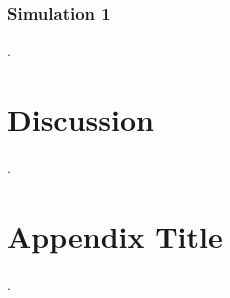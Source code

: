 \documentclass[draft, grl]{agutex}
\begin{document}
\begin{article}
\subsubsection{Simulation 1}

.


\section{Discussion}

.





\appendix

\section{Appendix Title}

.


%
%
%


\end{article}
\end{document}
